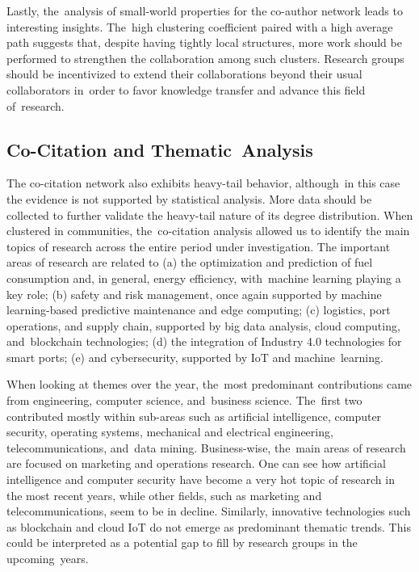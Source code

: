 \documentclass[jmse,review,accept,pdftex,moreauthors]{Definitions/mdpi}
\begin{document}
Lastly, the~analysis of small-world properties for the co-author network leads to interesting insights. The~high clustering coefficient paired with a high average path suggests that, despite having tightly local structures, more work should be performed to strengthen the collaboration among such clusters. Research groups should be incentivized to extend their collaborations beyond their usual collaborators in~order to favor knowledge transfer and advance this field of~research.

\subsection{Co-Citation and Thematic~Analysis}
The co-citation network also exhibits heavy-tail behavior, although~in this case the evidence is not supported by statistical analysis. More data should be collected to further validate the heavy-tail nature of its degree distribution. When clustered in communities, the~co-citation analysis allowed us to identify the main topics of research across the entire period under investigation. The important areas of research are related to (a) the optimization and prediction of fuel consumption and, in general, energy efficiency, with~machine learning playing a key role; (b) safety and risk management, once again supported by machine learning-based predictive maintenance and edge computing; (c) logistics, port operations, and supply chain, supported by big data analysis, cloud computing, and~blockchain technologies; (d) the integration of Industry 4.0 technologies for smart ports; (e) and cybersecurity, supported by IoT and machine~learning.

When looking at themes over the year, the~most predominant contributions came from engineering, computer science, and~business science. The~first two contributed mostly within sub-areas such as artificial intelligence, computer security, operating systems, mechanical and electrical engineering, telecommunications, and~data mining. Business-wise, the~main areas of research are focused on marketing and operations research. One can see how artificial intelligence and computer security have become a very hot topic of research in the most recent years, while other fields, such as marketing and telecommunications, seem to be in decline. Similarly, innovative technologies such as blockchain and cloud IoT do not emerge as predominant thematic trends. This could be interpreted as a potential gap to fill by research groups in the upcoming~years.
\end{document}
